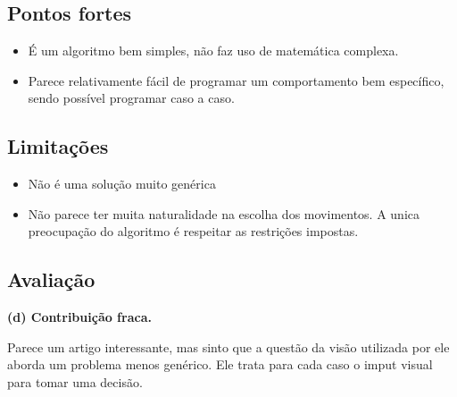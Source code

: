 \subsection{Pontos fortes} %
\begin{itemize}
  \item É um algoritmo bem simples, não faz uso de matemática complexa.
  \item Parece relativamente fácil de programar um comportamento bem específico, sendo possível programar caso a caso.
\end{itemize}  

\subsection{Limitações} %
\begin{itemize}
  \item Não é uma solução muito genérica
  \item Não parece ter muita naturalidade na escolha dos movimentos. A unica preocupação do algoritmo é respeitar as restrições impostas.
\end{itemize} 


\subsection{Avaliação}
 \textbf{(d) Contribuição fraca.}

Parece um artigo interessante, mas sinto que a questão da visão utilizada por ele aborda um problema menos genérico. Ele trata para cada caso o imput visual para tomar uma decisão.